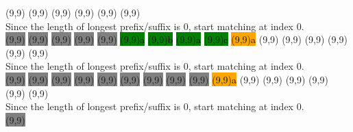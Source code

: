 \begin{center}
  \colorbox{white}{\makebox(9,9){\textcolor{black}{}}}
  \colorbox{white}{\makebox(9,9){\textcolor{black}{}}}
  \colorbox{white}{\makebox(9,9){\textcolor{black}{}}}
  \colorbox{white}{\makebox(9,9){\textcolor{black}{}}}
  \colorbox{white}{\makebox(9,9){\textcolor{black}{}}}
  \colorbox{white}{\makebox(9,9){\textcolor{black}{}}}
  \\
  Since the length of longest prefix/suffix is 0, start matching at index 0.
  \\
  \colorbox{gray}{\makebox(9,9){\textcolor{black}{}}}
  \colorbox{gray}{\makebox(9,9){\textcolor{black}{}}}
  \colorbox{gray}{\makebox(9,9){\textcolor{black}{}}}
  \colorbox{gray}{\makebox(9,9){\textcolor{black}{}}}
  \colorbox{gray}{\makebox(9,9){\textcolor{black}{}}}
  \colorbox{green}{\makebox(9,9){\textcolor{black}{a}}}
  \colorbox{green}{\makebox(9,9){\textcolor{black}{b}}}
  \colorbox{green}{\makebox(9,9){\textcolor{black}{a}}}
  \colorbox{green}{\makebox(9,9){\textcolor{black}{c}}}
  \colorbox{orange}{\makebox(9,9){\textcolor{black}{a}}}
  \colorbox{white}{\makebox(9,9){\textcolor{black}{}}}
  \colorbox{white}{\makebox(9,9){\textcolor{black}{}}}
  \colorbox{white}{\makebox(9,9){\textcolor{black}{}}}
  \colorbox{white}{\makebox(9,9){\textcolor{black}{}}}
  \colorbox{white}{\makebox(9,9){\textcolor{black}{}}}
  \colorbox{white}{\makebox(9,9){\textcolor{black}{}}}
  \\
  Since the length of longest prefix/suffix is 0, start matching at index 0.
  \\
  \colorbox{gray}{\makebox(9,9){\textcolor{black}{}}}
  \colorbox{gray}{\makebox(9,9){\textcolor{black}{}}}
  \colorbox{gray}{\makebox(9,9){\textcolor{black}{}}}
  \colorbox{gray}{\makebox(9,9){\textcolor{black}{}}}
  \colorbox{gray}{\makebox(9,9){\textcolor{black}{}}}
  \colorbox{gray}{\makebox(9,9){\textcolor{black}{}}}
  \colorbox{gray}{\makebox(9,9){\textcolor{black}{}}}
  \colorbox{gray}{\makebox(9,9){\textcolor{black}{}}}
  \colorbox{gray}{\makebox(9,9){\textcolor{black}{}}}
  \colorbox{orange}{\makebox(9,9){\textcolor{black}{a}}}
  \colorbox{white}{\makebox(9,9){\textcolor{black}{}}}
  \colorbox{white}{\makebox(9,9){\textcolor{black}{}}}
  \colorbox{white}{\makebox(9,9){\textcolor{black}{}}}
  \colorbox{white}{\makebox(9,9){\textcolor{black}{}}}
  \colorbox{white}{\makebox(9,9){\textcolor{black}{}}}
  \colorbox{white}{\makebox(9,9){\textcolor{black}{}}}
  \\
  Since the length of longest prefix/suffix is 0, start matching at index 0.
  \\
  \colorbox{gray}{\makebox(9,9){\textcolor{black}{}}}

\end{center}
